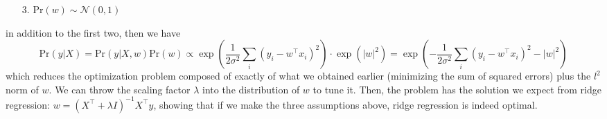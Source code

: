 \documentclass{article}
\begin{document}
\begin{enumerate}
    \item [3.] $ \text{Pr}(w) \sim \mathcal{N}(0, 1) $
\end{enumerate}
in addition to the first two, then we have
$$ \text{Pr}(y | X) = \text{Pr}(y | X, w) \text{Pr}(w) \propto \exp \left( \frac{1}{2 \sigma^2} \sum_i (y_i - w^\intercal x_i)^2 \right) \cdot \exp \left( | w |^2 \right) = \exp \left( - \frac{1}{2 \sigma^2} \sum_i (y_i - w^\intercal x_i)^2 - | w |^2 \right) $$
which reduces the optimization problem composed of exactly of what we obtained earlier (minimizing the sum of squared errors) plus the $ l^2 $ norm of $ w $. We can throw the scaling factor $ \lambda $ into the distribution of $ w $ to tune it. Then, the problem has the solution we expect from ridge regression: $ w = (X^\intercal + \lambda I)^{-1} X^\intercal y $, showing that if we make the three assumptions above, ridge regression is indeed optimal.
\end{document}
